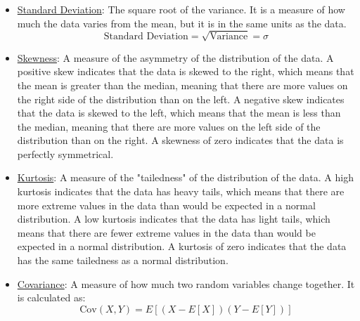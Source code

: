 \begin{itemize}
\begin{equation*}
    \end{equation*}
    It can be however calculated using the Besel correction, which divides by $n-1$ instead of $n$ to provide an unbiased estimator of the population variance when working with a sample. This is because when we calculate the sample mean, we are using the same data points that we are trying to estimate the variance for, which can lead to an underestimation of the true population variance. By dividing by $n-1$, we are effectively increasing the variance estimate to account for this bias.
    \begin{equation*}
        \text{Sample Variance} = \frac{1}{n-1} \sum_{i=1}^{n} (x_i - \mu)^2
    \end{equation*}
    \item \ul{Standard Deviation}: The square root of the variance. It is a measure of how much the data varies from the mean, but it is in the same units as the data.
    \begin{equation*}
        \text{Standard Deviation} = \sqrt{\text{Variance}} = \sigma
    \end{equation*}
    \item \ul{Skewness}: A measure of the asymmetry of the distribution of the data. A positive skew indicates that the data is skewed to the right, which means that the mean is greater than the median, meaning that there are more values on the right side of the distribution than on the left. A negative skew indicates that the data is skewed to the left, which means that the mean is less than the median, meaning that there are more values on the left side of the distribution than on the right. A skewness of zero indicates that the data is perfectly symmetrical.
    \item \ul{Kurtosis}: A measure of the "tailedness" of the distribution of the data. A high kurtosis indicates that the data has heavy tails, which means that there are more extreme values in the data than would be expected in a normal distribution. A low kurtosis indicates that the data has light tails, which means that there are fewer extreme values in the data than would be expected in a normal distribution. A kurtosis of zero indicates that the data has the same tailedness as a normal distribution.
    \item \ul{Covariance}: A measure of how much two random variables change together. It is calculated as:
    \begin{equation*}
        \text{Cov}(X, Y) = E[(X - E[X])(Y - E[Y])]
    \end{equation*}

\end{itemize}
